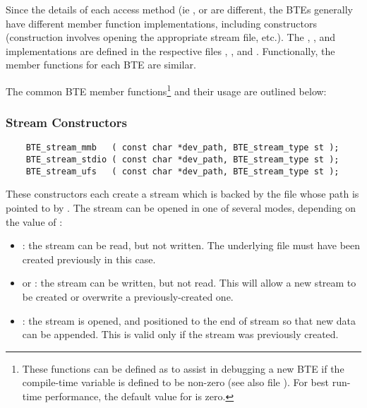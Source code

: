 Since the details of each access method (ie
,  or  are
different, the BTEs generally have different member function
implementations, including constructors (construction
involves opening the appropriate stream file, etc.).
The , , and
 implementations are defined in the
respective files ,
, and .
Functionally, the member functions for each BTE are similar.

The common BTE member functions\footnote{%
   These functions can be defined as  to
   assist in debugging a new BTE if the compile-time
   variable  is defined to be
   non-zero (see also file ). For best
   run-time performance, the default value for
    is zero.  } 
and their usage are outlined below:

\subsubsection{Stream Constructors}
\begin{verbatim}
    BTE_stream_mmb   ( const char *dev_path, BTE_stream_type st );
    BTE_stream_stdio ( const char *dev_path, BTE_stream_type st );
    BTE_stream_ufs   ( const char *dev_path, BTE_stream_type st );
\end{verbatim}

These constructors each create a stream which is backed by
the file whose path is pointed to by .  The
stream can be opened in one of several modes, depending on
the value of :

\begin{itemize}

    \item {}: the stream can be read,
    but not written. The underlying file must have been
    created previously in this case.
    \item {} or
    : the stream can be
    written, but not read. This will allow a new stream to
    be created or overwrite a previously-created one.

    \item {}: the stream is opened,
    and positioned to the end of stream so that new data can
    be appended. This is valid only if the stream was
    previously created. 
\end{itemize}

